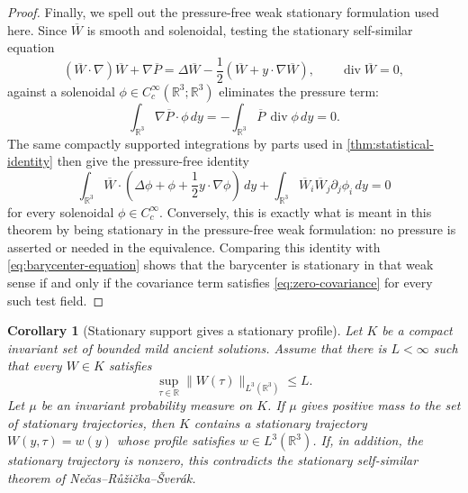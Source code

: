 \documentclass[11pt]{amsart}
\theoremstyle{plain}
\newtheorem{corollary}[theorem]{Corollary}
\theoremstyle{definition}
\theoremstyle{remark}
\numberwithin{equation}{section}
\begin{document}
\begin{proof}
Finally, we spell out the pressure-free weak stationary formulation used here.
Since \(\overline W\) is smooth and solenoidal, testing the stationary
self-similar equation
\[
   (\overline W\cdot\nabla)\overline W+\nabla \overline P
   =
   \Delta\overline W-\frac12(\overline W+y\cdot\nabla\overline W),
   \qquad \operatorname{div}\overline W=0 ,
\]
against a solenoidal \(\phi\in C_c^\infty(\mathbb R^3;\mathbb R^3)\) eliminates
the pressure term:
\[
   \int_{\mathbb R^3}\nabla\overline P\cdot\phi\,dy
   =
   -\int_{\mathbb R^3}\overline P\,\operatorname{div}\phi\,dy=0 .
\]
The same compactly supported integrations by parts used in
\cref{thm:statistical-identity} then give the pressure-free identity
\[
   \int_{\mathbb R^3}
   \overline W\cdot
   \left(\Delta\phi+\phi+\frac12 y\cdot\nabla\phi\right)\,dy
   +
   \int_{\mathbb R^3}
   \overline W_i\overline W_j\partial_j\phi_i\,dy
   =0
\]
for every solenoidal \(\phi\in C_c^\infty\).  Conversely, this is exactly what
is meant in this theorem by being stationary in the pressure-free weak
formulation: no pressure is asserted or needed in the equivalence.  Comparing
this identity with \eqref{eq:barycenter-equation} shows that the barycenter is
stationary in that weak sense if and only if the covariance term satisfies
\eqref{eq:zero-covariance} for every such test field.
\end{proof}

\begin{corollary}[Stationary support gives a stationary profile]\label{cor:stationary-support}
Let \(K\) be a compact invariant set of bounded mild ancient solutions.
Assume that there is \(L<\infty\) such that every \(W\in K\) satisfies
\[
   \sup_{\tau\in\mathbb R}\|W(\tau)\|_{L^3(\mathbb R^3)}\le L .
\]
Let \(\mu\) be an invariant probability measure on \(K\).  If \(\mu\) gives
positive mass to the set of stationary trajectories, then \(K\) contains a
stationary trajectory \(W(y,\tau)=w(y)\) whose profile satisfies
\(w\in L^3(\mathbb R^3)\).  If, in addition, the stationary trajectory is
nonzero, this contradicts the stationary self-similar theorem of
Ne\v{c}as--R\r{u}\v{z}i\v{c}ka--\v{S}ver\'ak.
\end{corollary}
\end{document}

